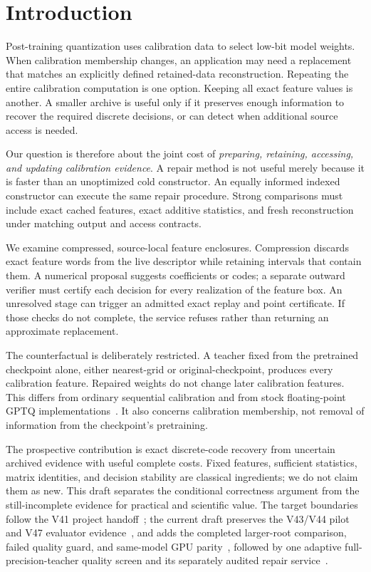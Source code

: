 \documentclass[10pt,twocolumn,letterpaper]{article}
\begin{document}
\section{Introduction}
Post-training quantization uses calibration data to select low-bit model weights.
When calibration membership changes, an application may need a replacement that
matches an explicitly defined retained-data reconstruction. Repeating the entire
calibration computation is one option. Keeping all exact feature values is
another. A smaller archive is useful only if it preserves enough information to
recover the required discrete decisions, or can detect when additional source
access is needed.

Our question is therefore about the joint cost of \emph{preparing, retaining,
accessing, and updating calibration evidence}. A repair method is not useful
merely because it is faster than an unoptimized cold constructor. An equally
informed indexed constructor can execute the same repair procedure. Strong
comparisons must include exact cached features, exact additive statistics, and
fresh reconstruction under matching output and access contracts.

We examine compressed, source-local feature enclosures. Compression discards
exact feature words from the live descriptor while retaining intervals that
contain them. A numerical proposal suggests coefficients or codes; a separate
outward verifier must certify each decision for every realization of the feature
box. An unresolved stage can trigger an admitted exact replay and point
certificate. If those checks do not complete, the service refuses rather than
returning an approximate replacement.

The counterfactual is deliberately restricted. A teacher fixed from the pretrained
checkpoint alone, either nearest-grid or original-checkpoint, produces every
calibration feature. Repaired weights do not change later calibration features. This differs
from ordinary sequential calibration and from stock floating-point GPTQ
implementations~\cite{gptq}. It also concerns calibration membership, not removal
of information from the checkpoint's pretraining.

The prospective contribution is exact discrete-code recovery from uncertain
archived evidence with useful complete costs. Fixed features, sufficient
statistics, matrix identities, and decision stability are classical ingredients;
we do not claim them as new. This draft separates the conditional correctness
argument from the still-incomplete evidence for practical and scientific value.
The target boundaries follow the V41 project handoff~\cite{boundaries};
the current draft preserves the V43/V44 pilot and V47 evaluator evidence~\cite{v43,v44,v47},
and adds the completed larger-root comparison, failed quality guard, and
same-model GPU parity~\cite{v58terminal}, followed by one adaptive
full-precision-teacher quality screen and its separately audited repair
service~\cite{v59terminal,v62terminal}.
\end{document}
